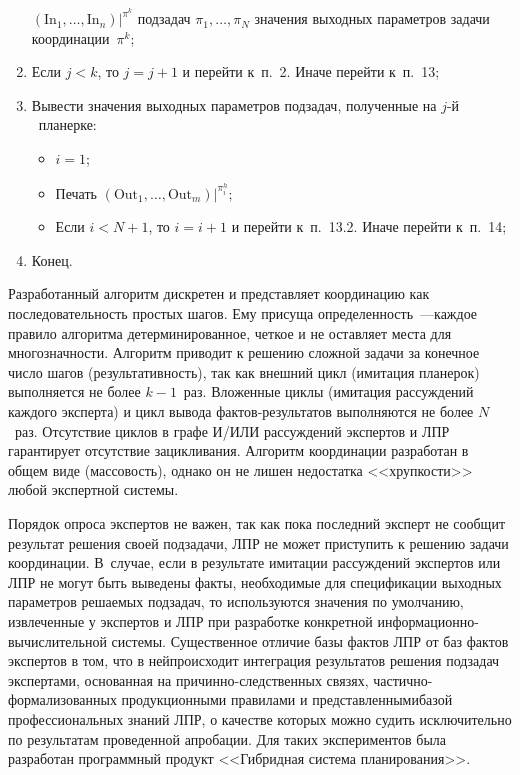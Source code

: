 \begin{multicols}{2}
\begin{enumerate}[1)]
$(\mathrm{In}_1,  \ldots , \mathrm{In}_n)\vert^{\pi^k}$ подзадач $\pi_1, \ldots ,\pi_N$ значения 
выходных параметров задачи координации~$\pi^k$;
\item Если $j < k$, то $j = j + 1$ и перейти к~п.~2. Иначе перейти к~п.~13;
\item Вывести значения выходных параметров подзадач, полученные на 
$j$-й ~планерке:
\begin{itemize}
\item[13.1)] $i = 1$;
\item[13.2)] Печать $(\mathrm{Out}_1, \ldots ,\mathrm{Out}_m)\vert^{\pi_i^h}$;
\item[13.3)] Если $i < N + 1$, то $i = i + 1$ и перейти к~п.~13.2. Иначе 
перейти к~п.~14;
\end{itemize}
\item Конец.
\end{enumerate}
  
  Разработанный алгоритм дискретен и пред\-ставля\-ет координацию как 
последовательность прос\-тых шагов. Ему присуща определенность~---\linebreak каждое 
правило алгоритма детерминированное, четкое и не оставляет места для 
многозначности. Алгоритм приводит к решению сложной задачи за конечное 
число шагов (результативность), так как внешний цикл (имитация планерок) 
выполняется не более $k - 1$~раз. Вложенные циклы (имитация рассуждений 
каждого эксперта) и цикл вывода фактов-результатов выполняются не более 
$N$~раз. Отсутствие циклов в графе И/ИЛИ рассуждений экспертов и ЛПР 
гарантирует отсутствие зацикливания. Алгоритм координации разработан в 
общем виде (массовость), однако он не лишен недостатка <<хрупкости>> 
любой экспертной системы.
  
  Порядок опроса экспертов не важен, так как пока последний эксперт не 
сообщит результат решения своей подзадачи, ЛПР не может приступить к 
решению задачи координации.  В~случае, если в результате имитации 
рассуждений экспертов или ЛПР не могут быть выведены факты, необходимые 
для спецификации выходных параметров решаемых подзадач, то используются 
значения по умолчанию, извлеченные у экспертов и ЛПР при  разработке 
конкретной ин\-фор\-ма\-ци\-он\-но-вы\-чис\-ли\-тель\-ной сис\-те\-мы. 
Существенное отличие базы фактов ЛПР от баз фактов экспертов в том, что в 
ней\linebreak происходит интеграция результатов решения подзадач экспертами, 
основанная на при\-чин\-но-след\-ст\-вен\-ных связях, 
  час\-тич\-но-фор\-ма\-ли\-зо\-ван\-ных продукционными правилами и 
представленными\linebreak базой профессиональных знаний ЛПР, о качестве которых 
можно судить исключительно по результатам проведенной апробации. Для 
таких экспериментов была разработан программный продукт <<Гибридная 
система планирования>>.
  

\end{multicols}
